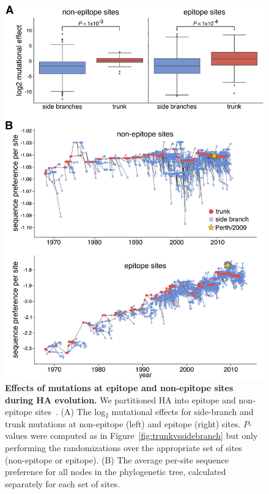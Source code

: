 \documentclass[9pt,twocolumn,twoside]{pnas-new}
\begin{document}
\begin{figure}
\centering
\includegraphics[width=\columnwidth]{figs/sequence_preference/sequence_preference.pdf}
\caption{\label{fig:sequence_preference}
{\bf Effects of mutations at epitope and non-epitope sites during HA evolution.}
We partitioned HA into epitope and non-epitope sites~\cite{wolf2006long}.
(A) The log$_{2}$ mutational effects for side-branch and trunk mutations at non-epitope (left) and epitope (right) sites.
$P$-values were computed as in Figure~\ref{fig:trunkvssidebranch} but only performing the randomizations over the appropriate set of sites (non-epitope or epitope).
(B) 
The average per-site sequence preference for all nodes in the phylogenetic tree, calculated separately for each set of sites.
}
\end{figure}
\end{document}
